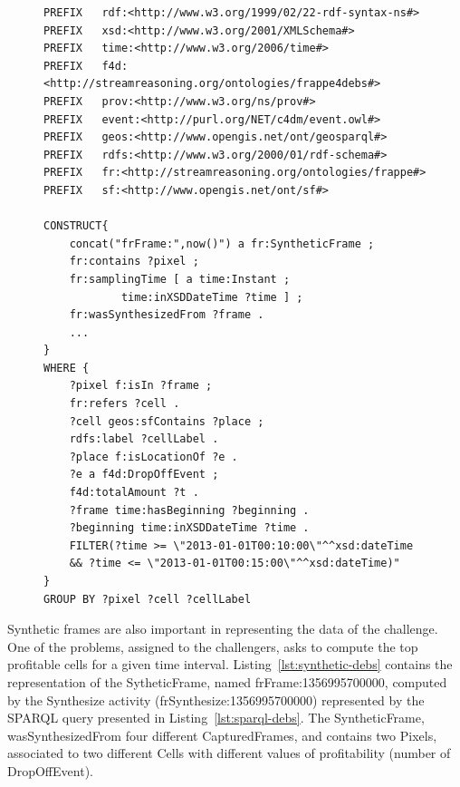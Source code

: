\begin{figure}[t]
\begin{minipage}[t]{0.95\linewidth}
\begin{lstlisting}[label={lst:sparql-debs}, caption={Sparql query to create the \textsc{SytheticFrame}s containing the \textsc{Pixel}s with the profitability value.}, style=SPARQL]
PREFIX   rdf:<http://www.w3.org/1999/02/22-rdf-syntax-ns#>
PREFIX   xsd:<http://www.w3.org/2001/XMLSchema#>
PREFIX   time:<http://www.w3.org/2006/time#>
PREFIX   f4d:<http://streamreasoning.org/ontologies/frappe4debs#>
PREFIX   prov:<http://www.w3.org/ns/prov#> 
PREFIX   event:<http://purl.org/NET/c4dm/event.owl#>
PREFIX   geos:<http://www.opengis.net/ont/geosparql#>
PREFIX   rdfs:<http://www.w3.org/2000/01/rdf-schema#>
PREFIX   fr:<http://streamreasoning.org/ontologies/frappe#>
PREFIX   sf:<http://www.opengis.net/ont/sf#>

CONSTRUCT{
    concat("frFrame:",now()") a fr:SyntheticFrame ;
    fr:contains ?pixel ;
    fr:samplingTime [ a time:Instant ; 
    		time:inXSDDateTime ?time ] ;
    fr:wasSynthesizedFrom ?frame . 
    ...
}
WHERE {
	?pixel f:isIn ?frame ;
	fr:refers ?cell .
	?cell geos:sfContains ?place ;
	rdfs:label ?cellLabel .
	?place f:isLocationOf ?e .
	?e a f4d:DropOffEvent ;
	f4d:totalAmount ?t .
	?frame time:hasBeginning ?beginning .
	?beginning time:inXSDDateTime ?time .
	FILTER(?time >= \"2013-01-01T00:10:00\"^^xsd:dateTime
    && ?time <= \"2013-01-01T00:15:00\"^^xsd:dateTime)"
}
GROUP BY ?pixel ?cell ?cellLabel
\end{lstlisting}
\end{minipage}
\end{figure} 

Synthetic frames are also important in representing the data of the challenge. One of the problems, assigned to the challengers, asks to compute the top profitable cells for a given time interval. Listing~\ref{lst:synthetic-debs} contains the representation of the \textsf{SytheticFrame}, named \textsf{frFrame:1356995700000}, computed by the \textsf{Synthesize} activity (\textsf{frSynthesize:1356995700000}) represented by the SPARQL query presented in Listing~\ref{lst:sparql-debs}. The \textsf{SyntheticFrame}, \textsf{wasSynthesizedFrom} four different \textsf{CapturedFrame}s, and contains two \textsf{Pixel}s, associated to two different \textsf{Cell}s with different values of profitability (number of \textsf{DropOffEvent}).

